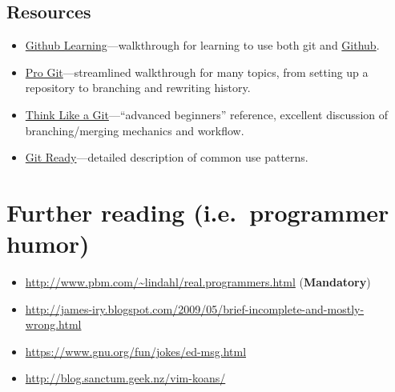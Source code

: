 \documentclass[openany,oneside]{report}
\begin{document}
\section{Resources}

\begin{itemize}
  \item \href{http://learn.Github.com/p/index.html}{Github Learning}---walkthrough for learning to use both git and \href{https://Github.com}{Github}.
  \item \href{http://git-scm.com/book}{Pro Git}---streamlined walkthrough for many topics, from setting up a repository to branching and rewriting history.
  \item \href{http://think-like-a-git.net/}{Think Like a Git}---``advanced beginners'' reference, excellent discussion of branching/merging mechanics and workflow.
  \item \href{http://gitready.com/}{Git Ready}---detailed description of common use patterns.
\end{itemize}

\chapter[Further reading]{Further reading (i.e.\ programmer humor)}
\begin{itemize}
  \item \url{http://www.pbm.com/~lindahl/real.programmers.html} (\textbf{Mandatory})
  \item \url{http://james-iry.blogspot.com/2009/05/brief-incomplete-and-mostly-wrong.html}
  \item \url{https://www.gnu.org/fun/jokes/ed-msg.html}
  \item \url{http://blog.sanctum.geek.nz/vim-koans/}
\end{itemize}
\end{document}
